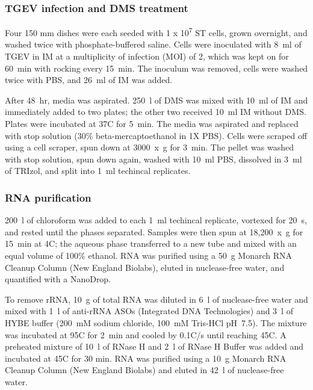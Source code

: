 \documentclass[main.tex]{subfiles}
\begin{document}
\subsubsection{TGEV infection and DMS treatment}

Four 150 mm dishes were each seeded with 1 x 10\textsuperscript{7} ST cells, grown overnight, and washed twice with phosphate-buffered saline.
Cells were inoculated with 8~ml of TGEV in IM at a multiplicity of infection (MOI) of 2, which was kept on for 60~min with rocking every 15~min.
The inoculum was removed, cells were washed twice with PBS, and 26~ml of IM was added.

After 48~hr, media was aspirated.
250~\textmu l of DMS was mixed with 10~ml of IM and immediately added to two plates; the other two received 10~ml IM without DMS.
Plates were incubated at 37\textdegree C for 5~min.
The media was aspirated and replaced with stop solution (30\% beta-mercaptoethanol in 1X PBS).
Cells were scraped off using a cell scraper, spun down at 3000~x~g for 3~min.
The pellet was washed with stop solution, spun down again, washed with 10~ml PBS, dissolved in 3~ml of TRIzol, and split into 1~ml techincal replicates.

\subsubsection{RNA purification}

200~\textmu l of chloroform was added to each 1~ml techincal replicate, vortexed for 20~s, and rested until the phases separated.
Samples were then spun at 18,200~x~g for 15~min at 4\textdegree C; the aqueous phase transferred to a new tube and mixed with an equal volume of 100\% ethanol.
RNA was purified using a 50~\textmu g Monarch RNA Cleanup Column (New England Biolabs), eluted in nuclease-free water, and quantified with a NanoDrop.

To remove rRNA, 10~\textmu g of total RNA was diluted in 6~\textmu l of nuclease-free water and mixed with 1~\textmu l of anti-rRNA ASOs (Integrated DNA Technologies) and 3~\textmu l of HYBE buffer (200~mM sodium chloride, 100~mM Tris-HCl pH~7.5).
The mixture was incubated at 95\textdegree C for 2~min and cooled by 0.1\textdegree C/s until reaching 45\textdegree C.
A preheated mixture of 10~\textmu l of RNase H and 2~\textmu l of RNase H Buffer was added and incubated at 45\textdegree C for 30 min.
RNA was purified using a 10~\textmu g Monarch RNA Cleanup Column (New England Biolabs) and eluted in 42~\textmu l of nuclease-free water.
\end{document}
